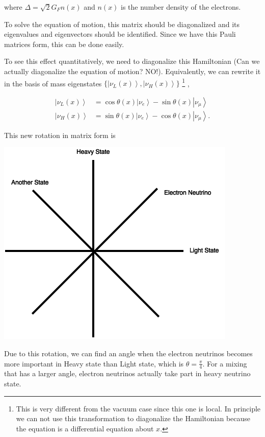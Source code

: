 \documentclass{tufte-handout}
\newcommand{\ket}[1]{\left| #1\right\rangle}
\begin{document}
where $\Delta = \sqrt{2} G_F n(x) $ and $n(x)$ is the number density of the electrons.

To solve the equation of motion, this matrix should be diagonalized and its eigenvalues and eigenvectors should be identified. Since we have this Pauli matrices form, this can be done easily.

To see this effect quantitatively, we need to diagonalize this Hamiltonian (Can we actually diagonalize the equation of motion? NO!). Equivalently, we can rewrite it in the basis of mass eigenstates  $\{\ket{\nu_L(x)}, \ket{\nu_H(x)}\}$ \footnote{This is very different from the vacuum case since this one is local. In principle we can not use this transformation to diagonalize the Hamiltonian because the equation is a differential equation about $x$.} , 

\begin{align*}
\ket{\nu_L(x)} &= \cos\theta(x) \ket{\nu_e} - \sin\theta(x) \ket{\nu_\mu} \\
\ket{\nu_H(x)} & =  \sin\theta(x) \ket{\nu_e} - \cos\theta(x) \ket{\nu_\mu}.
\end{align*}


This new rotation in matrix form is 

\begin{marginfigure}
\includegraphics{assets/heavyLightRotation}
\caption{Due to this rotation, we can find an angle when the electron neutrinos becomes more important in Heavy state than Light state, which is $\theta=\frac{\pi}{4}$. For a mixing that has a larger angle, electron neutrinos actually take part in heavy neutrino state.}
\end{marginfigure}
\end{document}
